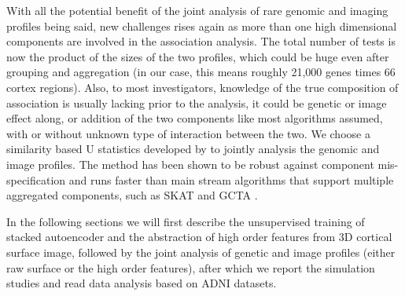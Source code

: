 With all the potential benefit of the joint analysis of rare genomic and imaging profiles being said, new challenges rises again as more than one high dimensional components are involved in the association analysis. The total number of tests is now the product of the sizes of the two profiles, which could be huge even after grouping and aggregation (in our case, this means roughly 21,000 genes times 66 cortex regions). Also, to most investigators, knowledge of the true composition of association is usually lacking prior to the analysis, it could be genetic or image effect along, or addition of the two components like most algorithms assumed, with or without unknown type of interaction between the two. We choose a similarity based U statistics developed by \cite{UST1, UST2} to jointly analysis the genomic and image profiles. The method has been shown to be robust against component mis-specification and runs faster than main stream algorithms that support multiple aggregated components, such as SKAT and GCTA \cite{SKAT, GCTA}.

In the following sections we will first describe the unsupervised training of stacked autoencoder and the abstraction of high order features from 3D cortical surface image, followed by the joint analysis of genetic and image profiles (either raw surface or the high order features), after which we report the simulation studies and read data analysis based on ADNI datasets.
